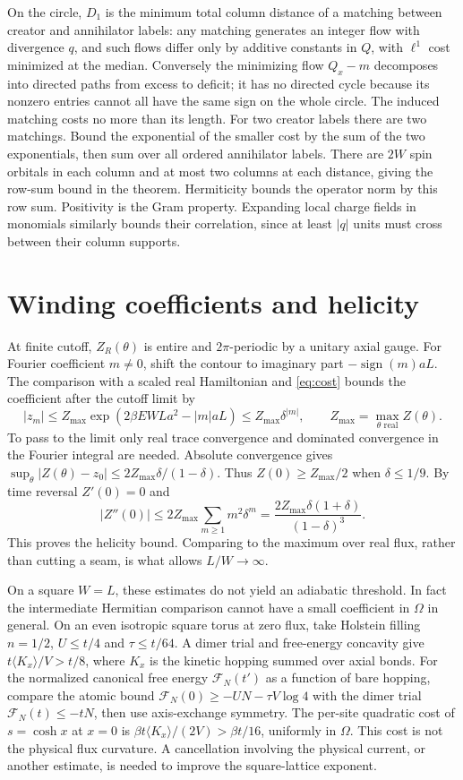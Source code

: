 \documentclass[11pt]{article}
\begin{document}
On the circle, $D_1$ is the minimum total column distance of a matching between creator and annihilator labels: any matching generates an integer flow with divergence $q$, and such flows differ only by additive constants in $Q$, with $\ell^1$ cost minimized at the median. Conversely the minimizing flow $Q_x-m$ decomposes into directed paths from excess to deficit; it has no directed cycle because its nonzero entries cannot all have the same sign on the whole circle. The induced matching costs no more than its length. For two creator labels there are two matchings. Bound the exponential of the smaller cost by the sum of the two exponentials, then sum over all ordered annihilator labels. There are $2W$ spin orbitals in each column and at most two columns at each distance, giving the row-sum bound in the theorem. Hermiticity bounds the operator norm by this row sum. Positivity is the Gram property. Expanding local charge fields in monomials similarly bounds their correlation, since at least $|q|$ units must cross between their column supports.

\section{Winding coefficients and helicity}
At finite cutoff, $Z_R(\theta)$ is entire and $2\pi$-periodic by a unitary axial gauge. For Fourier coefficient $m\ne0$, shift the contour to imaginary part $-\operatorname{sign}(m)aL$. The comparison with a scaled real Hamiltonian and \eqref{eq:cost} bounds the coefficient after the cutoff limit by
\[
 |z_m|\le Z_{\max}\exp(2\beta EWL a^2-|m|aL)\le Z_{\max}\delta^{|m|},
 \qquad Z_{\max}=\max_{\theta\text{ real}} Z(\theta).
\]
To pass to the limit only real trace convergence and dominated convergence in the Fourier integral are needed. Absolute convergence gives $\sup_\theta|Z(\theta)-z_0|\le2 Z_{\max}\delta/(1-\delta)$. Thus $Z(0)\ge Z_{\max}/2$ when $\delta\le1/9$. By time reversal $Z'(0)=0$ and
\[
 |Z''(0)|\le 2Z_{\max}\sum_{m\ge1}m^2\delta^m
   = \frac{2Z_{\max}\delta(1+\delta)}{(1-\delta)^3}.
\]
This proves the helicity bound. Comparing to the maximum over real flux, rather than cutting a seam, is what allows $L/W\to\infty$.

On a square $W=L$, these estimates do not yield an adiabatic threshold. In fact the intermediate Hermitian comparison cannot have a small coefficient in $\Omega$ in general. On an even isotropic square torus at zero flux, take Holstein filling $n=1/2$, $U\le t/4$ and $\tau\le t/64$. A dimer trial and free-energy concavity give $t\langle K_x\rangle/V>t/8$, where $K_x$ is the kinetic hopping summed over axial bonds. For the normalized canonical free energy $\mathcal F_N(t')$ as a function of bare hopping, compare the atomic bound $\mathcal F_N(0)\ge -UN-\tau V\log4$ with the dimer trial $\mathcal F_N(t)\le-tN$, then use axis-exchange symmetry. The per-site quadratic cost of $s=\cosh x$ at $x=0$ is $\beta t\langle K_x\rangle/(2V)>\beta t/16$, uniformly in $\Omega$. This cost is not the physical flux curvature. A cancellation involving the physical current, or another estimate, is needed to improve the square-lattice exponent.
\end{document}
